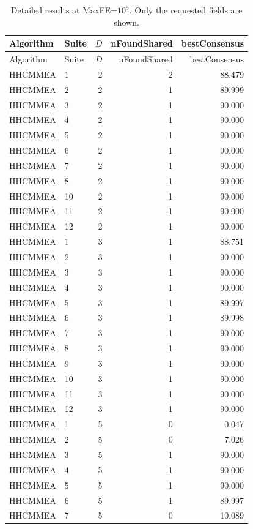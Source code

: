 \begin{longtable}{llrrr}
\caption{Detailed results at MaxFE=$10^5$. Only the requested fields are shown.}\label{tab:results-detail}\\
\toprule
Algorithm & Suite & $D$ & nFoundShared & bestConsensus \\
\midrule
\endfirsthead
\toprule
Algorithm & Suite & $D$ & nFoundShared & bestConsensus \\
\midrule
\endhead
HHCMMEA & 1 & 2 & 2 & 88.479 \\
HHCMMEA & 2 & 2 & 1 & 89.999 \\
HHCMMEA & 3 & 2 & 1 & 90.000 \\
HHCMMEA & 4 & 2 & 1 & 90.000 \\
HHCMMEA & 5 & 2 & 1 & 90.000 \\
HHCMMEA & 6 & 2 & 1 & 90.000 \\
HHCMMEA & 7 & 2 & 1 & 90.000 \\
HHCMMEA & 8 & 2 & 1 & 90.000 \\
HHCMMEA & 10 & 2 & 1 & 90.000 \\
HHCMMEA & 11 & 2 & 1 & 90.000 \\
HHCMMEA & 12 & 2 & 1 & 90.000 \\
HHCMMEA & 1 & 3 & 1 & 88.751 \\
HHCMMEA & 2 & 3 & 1 & 90.000 \\
HHCMMEA & 3 & 3 & 1 & 90.000 \\
HHCMMEA & 4 & 3 & 1 & 90.000 \\
HHCMMEA & 5 & 3 & 1 & 89.997 \\
HHCMMEA & 6 & 3 & 1 & 89.998 \\
HHCMMEA & 7 & 3 & 1 & 90.000 \\
HHCMMEA & 8 & 3 & 1 & 90.000 \\
HHCMMEA & 9 & 3 & 1 & 90.000 \\
HHCMMEA & 10 & 3 & 1 & 90.000 \\
HHCMMEA & 11 & 3 & 1 & 90.000 \\
HHCMMEA & 12 & 3 & 1 & 90.000 \\
HHCMMEA & 1 & 5 & 0 & 0.047 \\
HHCMMEA & 2 & 5 & 0 & 7.026 \\
HHCMMEA & 3 & 5 & 1 & 90.000 \\
HHCMMEA & 4 & 5 & 1 & 90.000 \\
HHCMMEA & 5 & 5 & 1 & 90.000 \\
HHCMMEA & 6 & 5 & 1 & 89.997 \\
HHCMMEA & 7 & 5 & 0 & 10.089 \\

\end{longtable}
